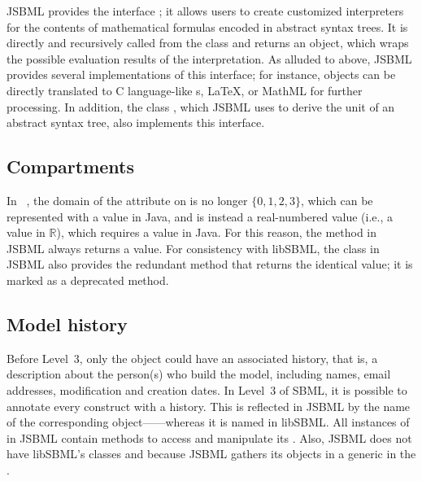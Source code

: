 JSBML provides the interface \ASTNodeCompiler; it allows users to create
customized interpreters for the contents of mathematical formulas encoded
in abstract syntax trees. It is directly and recursively called from the
\ASTNode class and returns an \ASTNodeValue object, which wraps the
possible evaluation results of the interpretation.  As alluded to above,
JSBML provides several implementations of this interface; for instance,
\ASTNode objects can be directly translated to C language-like \String{}s,
\LaTeX,  or MathML  for further
processing.  In addition, the class \UnitsCompiler, which JSBML uses to
derive the unit of an abstract syntax tree, also implements this interface.


\subsection{Compartments}

In \SBMLthree~\citep{Hucka2010a}, the domain of the attribute
 on \Compartment is no longer $\lbrace 0, 1, 2,
3\rbrace$, which can be represented with a  value in Java, and is
instead a real-numbered value (i.e., a value in $\mathbb{R}$), which requires
a  value in Java. For this reason, the method
 in JSBML always returns a 
value. For consistency with libSBML, the \Compartment class in JSBML also
provides the redundant method  that
returns the identical value; it is marked as a deprecated method.
%
%


\subsection{Model history}

Before \SBML Level~3, only the \Model object could have an associated
history, that is, a description about the person(s) who build the model,
including names, email addresses, modification and creation dates.  In
Level~3 of SBML, it is possible to annotate every construct with a
history. This is reflected in JSBML by the name of the corresponding
object---\History---whereas it is named \ModelHistory in libSBML.  All
instances of \SBase in JSBML contain methods to access and manipulate its
\History. Also, JSBML does not have libSBML's classes \ModelCreator
and \ModelCreatorList because JSBML gathers its \Creator objects in a generic
 in the \History.


